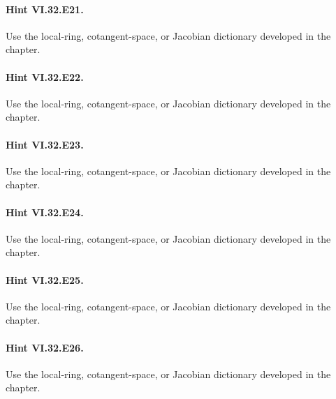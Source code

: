 \paragraph{Hint VI.32.E21.} Use the local-ring, cotangent-space, or Jacobian dictionary developed in the chapter.
\paragraph{Hint VI.32.E22.} Use the local-ring, cotangent-space, or Jacobian dictionary developed in the chapter.
\paragraph{Hint VI.32.E23.} Use the local-ring, cotangent-space, or Jacobian dictionary developed in the chapter.
\paragraph{Hint VI.32.E24.} Use the local-ring, cotangent-space, or Jacobian dictionary developed in the chapter.
\paragraph{Hint VI.32.E25.} Use the local-ring, cotangent-space, or Jacobian dictionary developed in the chapter.
\paragraph{Hint VI.32.E26.} Use the local-ring, cotangent-space, or Jacobian dictionary developed in the chapter.
